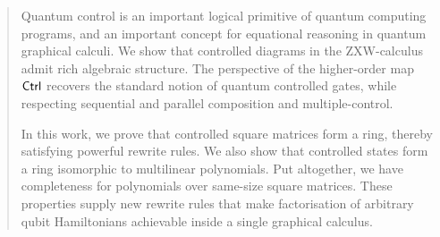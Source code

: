 \begin{abstract}
    Quantum control is an important logical primitive of quantum computing programs, and an important concept for equational reasoning in quantum graphical calculi.
    We show that controlled diagrams in the ZXW-calculus admit rich algebraic structure. The perspective of the higher-order map $\Control$ recovers the standard notion of quantum controlled gates, while respecting sequential and parallel composition and multiple-control.

    In this work, we prove that controlled square matrices form a ring, thereby satisfying powerful rewrite rules. We also show that controlled states form a ring isomorphic to multilinear polynomials. Put altogether, we have completeness for polynomials over same-size square matrices.
    These properties supply new rewrite rules that make factorisation of arbitrary qubit Hamiltonians achievable inside a single graphical calculus.
\end{abstract}